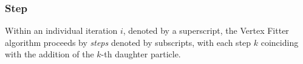 
%
%

%
%
%

\subsubsection{Step}
Within an individual iteration $i$, denoted by a superscript, the Vertex Fitter algorithm proceeds by \textit{steps} denoted by subscripts, with each step $k$ coinciding with the addition of the $k$-th daughter particle.

